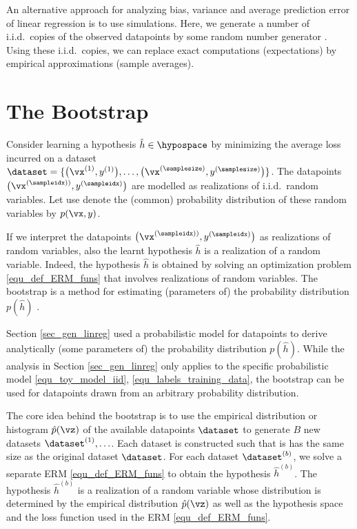 \documentclass[12pt]{report}
\begin{document}
An alternative approach for analyzing bias, variance and average 
prediction error of linear regression is to use simulations. Here, we 
generate a number of i.i.d.\ copies of the observed datapoints by 
some random number generator \cite{Andrieu2001}. Using these 
i.i.d.\ copies, we can replace exact computations (expectations) 
by empirical approximations (sample averages).  

\section{The Bootstrap} 

Consider learning a hypothesis $\hat{h} \in \hypospace$ by minimizing the 
average loss incurred on a dataset $\dataset=\{ \big(\vx^{(1)},y^{(1)}\big),\ldots,\big(\vx^{(\samplesize)},y^{(\samplesize)}\big)\}$. 
The datapoints $\big(\vx^{(\sampleidx))},y^{(\sampleidx)}\big)$ are modelled 
as realizations of i.i.d.\ random variables. Let use denote the (common) probability 
distribution of these random variables by $p(\vx,y)$. 

If we interpret the datapoints $\big(\vx^{(\sampleidx))},y^{(\sampleidx)}\big)$ as realizations of 
random variables, also the learnt hypothesis $\hat{h}$ is a realization  
of a random variable. Indeed, the hypothesis $\hat{h}$ is obtained by 
solving an optimization problem \eqref{equ_def_ERM_funs} that involves 
realizations of random variables. The bootstrap is a method for estimating 
(parameters of) the probability distribution $p(\hat{h})$ \cite{hastie01statisticallearning}.  

Section \ref{sec_gen_linreg} used a probabilistic model for 
datapoints to derive analytically (some parameters of) the probability 
distribution $p(\hat{h})$. While the analysis in Section \ref{sec_gen_linreg} 
only applies to the specific probabilistic model \eqref{equ_toy_model_iid}, \eqref{equ_labels_training_data}, 
the bootstrap can be used for datapoints drawn from an arbitrary 
probability distribution. 

The core idea behind the bootstrap is to use the empirical distribution 
or histogram $\hat{p}(\vz)$ of the available datapoints $\dataset$ to 
generate $B$ new datasets $\dataset^{(1)},\ldots$. Each dataset is 
constructed such that is has the same size as the original dataset $\dataset$. 
For each dataset $\dataset^{(b)}$, we solve a separate ERM \eqref{equ_def_ERM_funs} 
to obtain the hypothesis $\hat{h}^{(b)}$. The hypothesis $\hat{h}^{(b)}$ is a realization 
of a random variable whose distribution is determined by the empirical distribution 
$\hat{p}(\vz)$ as well as the hypothesis space and the loss function 
used in the ERM \eqref{equ_def_ERM_funs}. 
\end{document}
